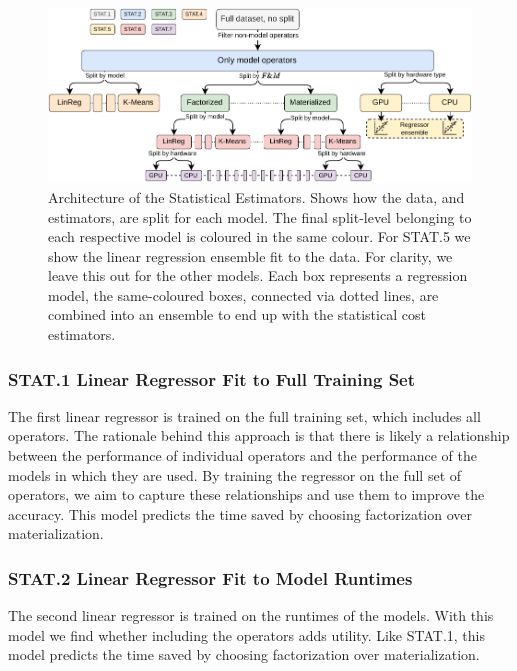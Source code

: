 \begin{figure}[ht]
    \centering
    \includegraphics[width=\linewidth]{chapters/05_cost_estimation/figures/statistical-architecture.pdf}
    \caption[Statistical Estimator Architecture]{Architecture of the Statistical Estimators. Shows how the data, and estimators, are split for each model. The final split-level belonging to each respective model is coloured in the same colour. For STAT.5 we show the linear regression ensemble fit to the data. For clarity, we leave this out for the other models. Each box represents a regression model, the same-coloured boxes, connected via dotted lines, are combined into an ensemble to end up with the statistical cost estimators.}
    \label{fig:5-statistical-architecture}
\end{figure}

\subsubsection*{STAT.1 Linear Regressor Fit to Full Training Set}
The first linear regressor is trained on the full training set, which includes all operators. The rationale behind this approach is that there is likely a relationship between the performance of individual operators and the performance of the models in which they are used. By training the regressor on the full set of operators, we aim to capture these relationships and use them to improve the accuracy. This model predicts the time saved by choosing factorization over materialization.

\subsubsection*{STAT.2 Linear Regressor Fit to Model Runtimes}
The second linear regressor is trained on the runtimes of the models. With this model we find whether including the operators adds utility. Like STAT.1, this model predicts the time saved by choosing factorization over materialization.

